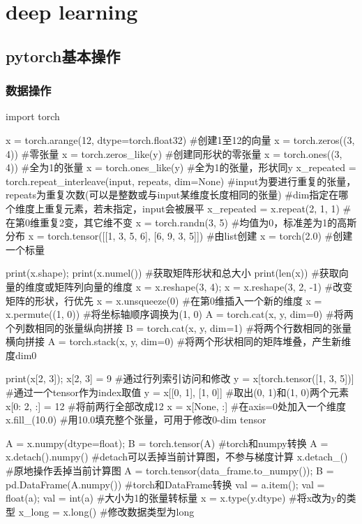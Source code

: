 \section{deep learning}

  \subsection{pytorch基本操作}
    \subsubsection{数据操作}
      \begin{codeblock}[language=python, caption={basic manipulation}]
        import torch

        x = torch.arange(12, dtype=torch.float32) #创建1至12的向量
        x = torch.zeros((3, 4)) #零张量
        x = torch.zeros_like(y) #创建同形状的零张量
        x = torch.ones((3, 4)) #全为1的张量
        x = torch.ones_like(y) #全为1的张量，形状同y
        x_repeated = torch.repeat_interleave(input, repeats, dim=None)
            #input为要进行重复的张量，repeats为重复次数(可以是整数或与input某维度长度相同的张量)
            #dim指定在哪个维度上重复元素，若未指定，input会被展平
        x_repeated = x.repeat(2, 1, 1) #在第0维重复2变，其它维不变
        x = torch.randn(3, 5) #均值为0，标准差为1的高斯分布 
        x = torch.tensor([[1, 3, 5, 6], [6, 9, 3, 5]]) #由list创建
        x = torch(2.0) #创建一个标量

        print(x.shape); print(x.numel()) #获取矩阵形状和总大小
        print(len(x)) #获取向量的维度或矩阵列向量的维度
        x = x.reshape(3, 4); x = x.reshape(3, 2, -1) #改变矩阵的形状，行优先
        x = x.unsqueeze(0) #在第0维插入一个新的维度
        x = x.permute((1, 0)) #将坐标轴顺序调换为(1, 0)
        A = torch.cat(x, y, dim=0) #将两个列数相同的张量纵向拼接
        B = torch.cat(x, y, dim=1) #将两个行数相同的张量横向拼接
        A = torch.stack(x, y, dim=0) #将两个形状相同的矩阵堆叠，产生新维度dim0

        print(x[2, 3]); x[2, 3] = 9 #通过行列索引访问和修改
        y = x[torch.tensor([1, 3, 5])] #通过一个tensor作为index取值
        y = x[[0, 1], [1, 0]] #取出(0, 1)和(1, 0)两个元素
        x[0: 2, :] = 12 #将前两行全部改成12
        x = x[None, :] #在axis=0处加入一个维度
        x.fill_(10.0) #用10.0填充整个张量，可用于修改0-dim tensor

        A = x.numpy(dtype=float); B = torch.tensor(A) #torch和numpy转换
        A = x.detach().numpy() #detach可以丢掉当前计算图，不参与梯度计算
        x.detach_() #原地操作丢掉当前计算图
        A = torch.tensor(data_frame.to_numpy()); B = pd.DataFrame(A.numpy()) #torch和DataFrame转换
        val = a.item(); val = float(a); val = int(a) #大小为1的张量转标量
        x = x.type(y.dtype) #将x改为y的类型
        x_long = x.long() #修改数据类型为long


\end{codeblock}
